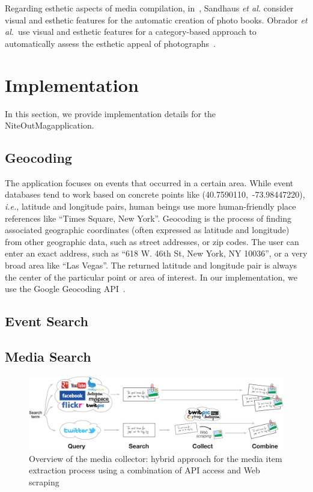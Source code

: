 \documentclass{acm_proc_article-sp}
\let\oldemph\emph
\renewcommand{\emph}[1]{\oldemph{\fontsize{9}{9}\selectfont #1}}
\begin{document}
Regarding esthetic aspects of media compilation,
in~\cite{Sandhaus2011}, Sandhaus \emph{et al.} consider visual and
esthetic features for the automatic creation of photo books.
Obrador \emph{et al.}\ use visual and esthetic features
for a category-based approach to automatically assess
the esthetic appeal of photographs~\cite{Obrador2012}.


\section{Implementation}
In this section, we provide implementation details for the
NiteOutMag\texttrademark application.

\subsection{Geocoding}
The application focuses on events that occurred in a certain area.
While event databases tend to work based on concrete points like
\mbox{(40.7590110, -73.98447220)}, \emph{i.e.},
latitude and longitude pairs, human beings use more human-friendly place references
like ``Times Square, New York''.
Geocoding is the process of finding associated geographic coordinates
(often expressed as latitude and longitude) from other geographic data,
such as street addresses, or zip codes.
The user can enter an exact address, such as
``618 W. 46th St, New York, NY 10036'', or a very broad area like ``Las Vegas''.
The returned latitude and longitude pair is always the center
of the particular point or area of interest.
In our implementation, we use the Google Geocoding API~\cite{Geocoding2012}.

\subsection{Event Search}

\subsection{Media Search}

\begin{figure}
\centering
\includegraphics[width=1.0\linewidth]{./architecture.pdf}
\caption{Overview of the media collector: hybrid approach for the media item extraction process using a combination of API access and Web scraping}
\label{fig:architecture}
\end{figure}
\end{document}
